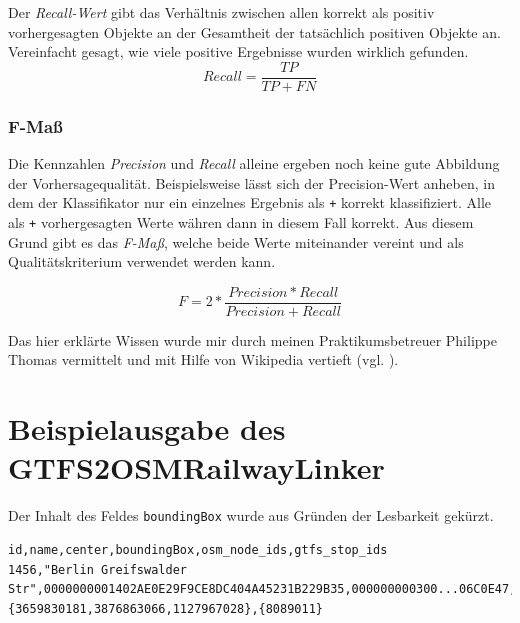 Der \textit{Recall-Wert} gibt das Verhältnis zwischen allen korrekt als positiv vorhergesagten Objekte an der Gesamtheit der tatsächlich positiven Objekte an. Vereinfacht gesagt, wie viele positive Ergebnisse wurden wirklich gefunden.
$$Recall = \frac{TP}{TP + FN}$$

\subsubsection{F-Maß}

Die Kennzahlen \textit{Precision} und \textit{Recall} alleine ergeben noch keine gute Abbildung der Vorhersagequalität.
Beispielsweise lässt sich der Precision-Wert anheben, in dem der Klassifikator nur ein einzelnes Ergebnis als \texttt{+} korrekt klassifiziert.
Alle als \texttt{+} vorhergesagten Werte währen dann in diesem Fall korrekt.
Aus diesem Grund gibt es das \textit{F-Maß}, welche beide Werte miteinander vereint und als Qualitätskriterium verwendet werden kann.

$$F = 2 * \frac{Precision * Recall}{Precision + Recall}$$

Das hier erklärte Wissen wurde mir durch meinen Praktikumsbetreuer Philippe Thomas vermittelt und mit Hilfe von Wikipedia vertieft (vgl. \cite{ wiki:fmeasure}).

\section{Beispielausgabe des GTFS2OSMRailwayLinker}
\label{sec:appendix:gtfs2osm_example}
Der Inhalt des Feldes \texttt{boundingBox} wurde aus Gründen der Lesbarkeit gekürzt.
\lstset{
  language=,
  numbers=left,
  caption=Ausgabe des GTFS2OSMRailwayLinker,
  label=,
}
\begin{lstlisting}
id,name,center,boundingBox,osm_node_ids,gtfs_stop_ids
1456,"Berlin Greifswalder Str",0000000001402AE0E29F9CE8DC404A45231B229B35,000000000300...06C0E47,{3659830181,3876863066,1127967028},{8089011}
\end{lstlisting}

